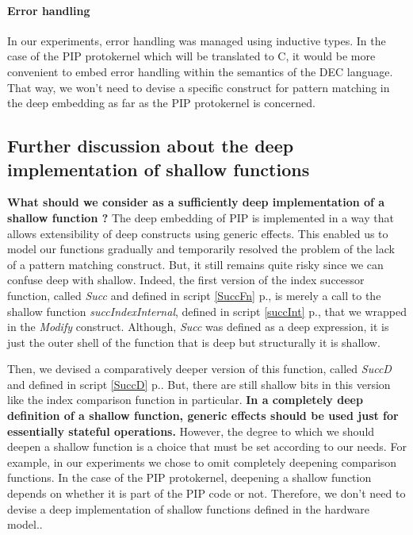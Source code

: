 \paragraph{Error handling}
In our experiments, error handling was managed using inductive types. In the case of the PIP protokernel which will be translated to C, it would be more convenient to embed error handling within the semantics of the DEC language. That way, we won't need to devise a specific construct for pattern matching in the deep embedding as far as the PIP protokernel is concerned. 

\subsection{Further discussion about the deep implementation of shallow functions}
\textbf{What should we consider as a sufficiently deep implementation of a shallow function ?} The deep embedding of PIP is implemented in a way that allows extensibility of deep constructs using generic effects. This enabled us to model our functions gradually and temporarily resolved the problem of the lack of a pattern matching construct. But, it still remains quite risky since we can confuse deep with shallow. Indeed, the first version of the index successor function, called \textit{Succ} and defined in script \ref{SuccFn} p.\pageref{SuccFn}, is merely a call to the shallow function \textit{succIndexInternal}, defined in script \ref{succInt} p.\pageref{succInt}, that we wrapped in the \textit{Modify} construct. Although, \textit{Succ} was  defined as a deep expression, it is just the outer shell of the function that is deep but structurally it is shallow. \pagebreak

Then, we devised a comparatively deeper version of this function, called \textit{SuccD} and defined in script \ref{SuccD} p.\pageref{SuccD}. But, there are still shallow bits in this version like the index comparison function in particular. \textbf{In a completely deep definition of a shallow function, generic effects should be used just for essentially stateful operations.} However, the degree  to which we should deepen a shallow function is a choice that must be set according to our needs. For example, in our experiments we chose to omit completely deepening comparison functions. In the case of the PIP protokernel, deepening a shallow function depends on whether it is part of the PIP code or not. Therefore, we don't need to devise a deep implementation of shallow functions defined in the hardware model..